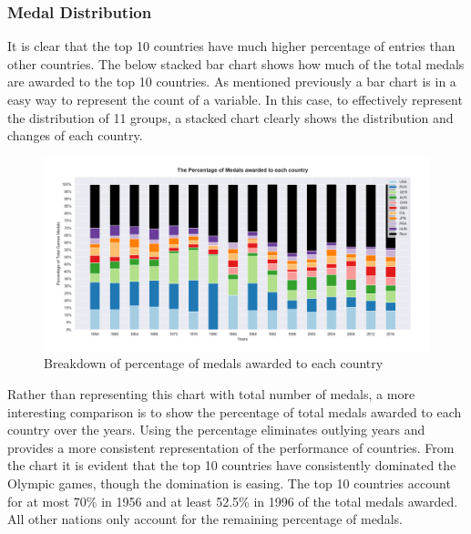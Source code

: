 \documentclass[a4 paper, 12pt]{article}
\begin{document}
        \subsubsection{Medal Distribution}
        It is clear that the top 10 countries have much higher percentage of entries than other countries. The below stacked bar chart shows how much of the total medals are awarded to the top 10 countries. As mentioned previously a bar chart is in a easy way to represent the count of a variable. In this case, to effectively represent the distribution of 11 groups, a stacked chart clearly shows the distribution and changes of each country.

        \begin{figure} [H]
            \centering
            \includegraphics[width=\textwidth, frame]
                {./images/graph/countries_medals_stacked.png}      
                \caption{Breakdown of percentage of medals awarded to each country} 
        \end{figure}

        Rather than representing this chart with total number of medals, a more interesting comparison is to show the percentage of total medals awarded to each country over the years. Using the percentage eliminates outlying years and provides a more consistent representation of the performance of countries. From the chart it is evident that the top 10 countries have consistently dominated the Olympic games, though the domination is easing. The top 10 countries account for at most 70\% in 1956 and at least 52.5\% in 1996 of the total medals awarded. All other nations only account for the remaining percentage of medals. 
\end{document}
